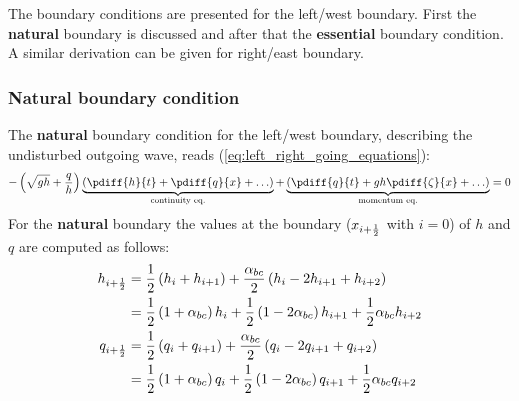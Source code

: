 The boundary conditions are presented for the left/west boundary.
First the \textbf{natural} boundary is discussed and after that the \textbf{essential} boundary condition.
A similar derivation can be given for right/east boundary.

\subsubsection{Natural boundary condition}

The \textbf{natural} boundary condition for the left/west boundary, describing the undisturbed outgoing wave, reads (\autoref{eq:left_right_going_equations}):
\begin{align}
- \left(\sqrt{gh} + \frac{q}{h}\right) \underbrace{ \left(\pdiff{h}{t} + \pdiff{q}{x} + \ldots \right) }_{\text{continuity eq.}} + \underbrace{\left(\pdiff{q}{t} + g h \pdiff{\zeta}{x}+\ldots\right)}_{\text{momentum eq.}} = 0
\end{align}
For the \textbf{natural} boundary the values at the boundary ($x_{i+\frac{1}{2}}$ with $i=0$) of $h$ and $q$ are computed as follows:
%
\begin{align}
    h_{i+\frac{1}{2}} & = \frac{1}{2} \left( h_{i} +  h_{i+1} \right) +
    \frac{\alpha_{bc}}{2} \left( h_{i}
    - 2 h_{i+1} + h_{i+2} \right)
    \nonumber \\*
    & = \frac{1}{2} \left( 1 + \alpha_{bc} \right) h_{i} +
    \frac{1}{2} \left( 1 - 2\alpha_{bc} \right) h_{i+1} +
    \frac{1}{2} \alpha_{bc} h_{i+2}\label{eq:h_at_left_boundary}
    \\
    q_{i+\frac{1}{2}} & =  \frac{1}{2} \left( q_{i} + q_{i+1}\right)
    + \frac{\alpha_{bc}}{2} \left( q_{i}
    - 2 q_{i+1} + q_{i+2} \right)
    \nonumber \\*
    & = \frac{1}{2} \left( 1 + \alpha_{bc} \right) q_{i} +
    \frac{1}{2} \left( 1 - 2\alpha_{bc} \right) q_{i+1} +
    \frac{1}{2} \alpha_{bc} q_{i+2}\label{eq:q_at_left_boundary}
\end{align}

